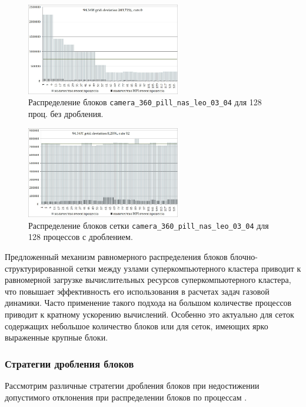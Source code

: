 \begin{figure}[ht]
	\centering
	\includegraphics[width=0.6\textwidth]{./pics/text_2_withcut/chart7.jpg}
	\caption{Распределение блоков \texttt{camera\_360\_pill\_nas\_leo\_03\_04}  для 128 проц. без дробления.}
	\label{fig:text_2_withcut_chart7}
\end{figure}

\begin{figure}[ht]
	\centering
	\includegraphics[width=0.6\textwidth]{./pics/text_2_withcut/chart8.jpg}
	\caption{Распределение блоков сетки \texttt{camera\_360\_pill\_nas\_leo\_03\_04} для 128 процессов с дроблением.}
	\label{fig:text_2_withcut_chart8}
\end{figure}

Предложенный механизм равномерного распределения блоков блочно-структурированной сетки между узлами суперкомпьютерного кластера приводит к равномерной загрузке вычислительных ресурсов суперкомпьютерного кластера, что повышает эффективность его использования в расчетах задач газовой динамики. Часто применение такого подхода на большом количестве процессов приводит к кратному ускорению вычислений. Особенно это актуально для сеток содержащих небольшое количество блоков или для сеток, имеющих ярко выраженные крупные блоки.

\subsubsection{Стратегии дробления блоков}

Рассмотрим различные стратегии дробления блоков при недостижении допустимого отклонения при распределении блоков по процессам \cite{Bendersky2017Eff}.

